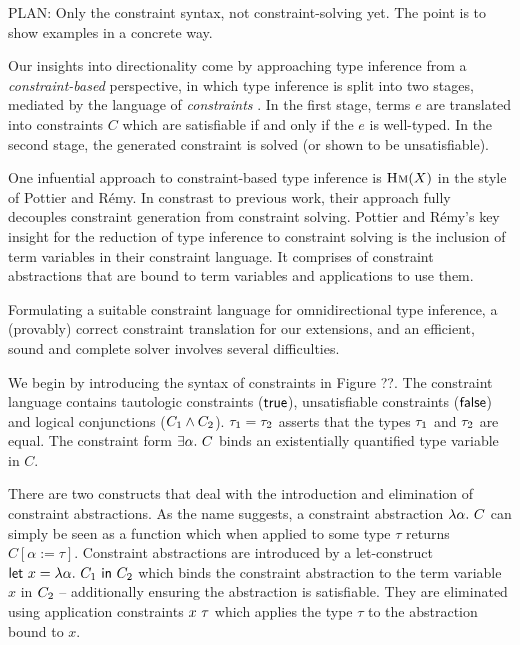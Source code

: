\documentclass[acmsmall,screen,nonacm]{acmart}
\begin{document}
PLAN: Only the constraint syntax, not constraint-solving yet. The point is to
show examples in a concrete way.

Our insights into directionality come by approaching type inference from a \textit{constraint-based} \citep{TODO} 
perspective, in which type inference is split into two stages, mediated by the language of \textit{constraints} \citep{TODO}. 
In the first stage, terms $e$ are translated into constraints $C$ which are satisfiable if and only if 
the $e$ is well-typed. In the second stage, the generated constraint is solved (or shown to be unsatisfiable). 

One infuential approach to constraint-based type inference is $\textsc{Hm}(X)$ in the style of Pottier and R\'emy. 
In constrast to previous work, their approach fully decouples constraint generation from constraint solving. 
Pottier and R\'emy's key insight for the reduction of type inference to constraint solving is the
inclusion of term variables in their constraint language. It comprises of constraint abstractions 
that are bound to term variables and applications to use them. 

Formulating a suitable constraint language for omnidirectional type inference, 
a (provably) correct constraint translation for our extensions, and an efficient, sound and 
complete solver involves several difficulties. 

We begin by introducing the syntax of constraints in Figure ??. The constraint language contains 
tautologic constraints ($\mathsf{true}$), unsatisfiable constraints ($\mathsf{false}$) and logical conjunctions 
($C_1 \wedge C_2$). $\tau_1 = \tau_2$ asserts that the types $\tau_1$ and $\tau_2$ are equal. 
The constraint form $\exists {\alpha}. ~ C$ binds an existentially quantified type variable in $C$.

There are two constructs that deal with the introduction and elimination of constraint
abstractions. As the name suggests, a constraint abstraction $\lambda {\alpha}. ~ {C}$ can simply be seen as a
function which when applied to some type $\tau$ returns $C[\alpha := \tau]$. Constraint abstractions 
are introduced by a let-construct $\mathsf{let} ~ x = \lambda {\alpha}. ~ {C_1} ~ \mathsf{in} ~ C_2$  which binds the constraint abstraction
to the term variable $x$ in $C_2$ -- additionally ensuring the abstraction is satisfiable. They are
eliminated using application constraints ${x} ~ {\tau}$ which applies the type $\tau$ to the abstraction
bound to $x$.
\end{document}
